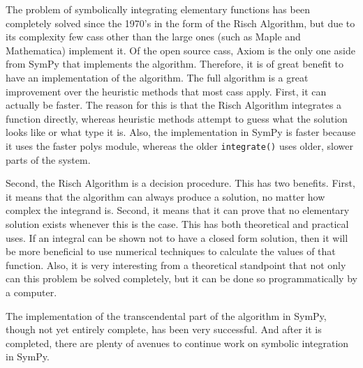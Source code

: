 The problem of symbolically integrating \gls{elementary} functions has
been completely solved since the 1970's in the form of the Risch
Algorithm, but due to its complexity few \glspl{cas} other than the
large ones (such as Maple and Mathematica) implement it.  Of the open
source \glspl{cas}, Axiom is the only one aside from SymPy that
implements the algorithm.  Therefore, it is of great benefit to have an
implementation of the algorithm.  The full algorithm is a great
improvement over the heuristic methods that most \glspl{cas} apply. 
First, it can actually be faster.  The reason for this is that the Risch
Algorithm integrates a function directly, whereas heuristic methods
attempt to guess what the solution looks like or what type it is.  Also,
the \rischintegrate{} implementation in SymPy is faster because it uses
the faster polys module, whereas the older \texttt{integrate()} uses
older, slower parts of the system.

Second, the Risch Algorithm is a decision procedure.  This has two
benefits.  First, it means that the algorithm can always produce a
solution, no matter how complex the \gls{integrand} is.  Second, it
means that it can prove that no \gls{elementary} solution exists
whenever this is the case. This has both theoretical and practical uses.
 If an integral can be shown not to have a closed form solution, then it
will be more beneficial to use numerical techniques to calculate the
values of that function.  Also, it is very interesting from a
theoretical standpoint that not only can this problem be solved
completely, but it can be done so programmatically by a computer.

The implementation of the \gls{transcendental} part of the algorithm in
SymPy, though not yet entirely complete, has been very successful. 
And after it is completed, there are plenty of avenues to continue work on
symbolic \gls{integration} in SymPy.
